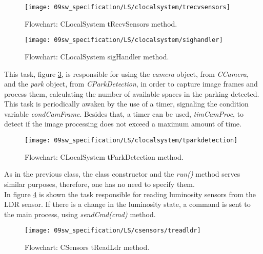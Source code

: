 \begin{figure}[H]
	\centering
	\texttt{[image: 09sw\_specification/LS/clocalsystem/trecvsensors]}
	\caption{Flowchart: CLocalSystem tRecvSensors method.}
	\label{fig:CLocalSystemtRecvSensors}
\end{figure}

\begin{figure}[H]
	\centering
	\texttt{[image: 09sw\_specification/LS/clocalsystem/sighandler]}
	\caption{Flowchart: CLocalSystem sigHandler method.}
	\label{fig:CLocalSystemsigHandler}
\end{figure}

\clearpage
This task, figure \ref{fig:CLocalSystemtParkDetection}, is responsible for using the \textit{camera} object, from \textit{CCamera}, and the \textit{park} object, from \textit{CParkDetection}, in order to capture image frames and process them, calculating the number of available spaces in the parking detected. This task is periodically awaken by the use of a timer, signaling the condition variable \textit{condCamFrame}. Besides that, a timer can be used, \textit{timCamProc}, to detect if the image processing does not exceed a maximum amount of time.

\begin{figure}[H]
	\centering
	\texttt{[image: 09sw\_specification/LS/clocalsystem/tparkdetection]}
	\caption{Flowchart: CLocalSystem tParkDetection method.}
	\label{fig:CLocalSystemtParkDetection}
\end{figure}

\clearpage
{}

As in the previous class, the class constructor and the \textit{run()} method serves similar purposes, therefore, one has no need to specify them.\\

In figure \ref{fig:CSensorstreadldr} is shown the task responsible for reading luminosity sensors from the LDR sensor. If there is a change in the luminosity state, a command is sent to the main process, using \textit{sendCmd(cmd)} method.

\begin{figure}[H]
	\centering
	\texttt{[image: 09sw\_specification/LS/csensors/treadldr]}
	\caption{Flowchart: CSensors tReadLdr method.}
	\label{fig:CSensorstreadldr}
\end{figure}

